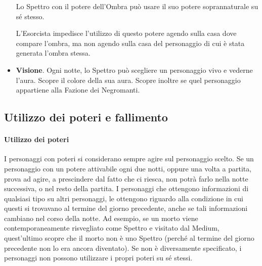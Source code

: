 \documentclass[a4paper,10pt]{article}
\begin{document}
\begin{itemize}
 Lo Spettro con il potere dell'Ombra può usare il suo potere soprannaturale su sé stesso.
 
 L'Esorcista impedisce l'utilizzo di questo potere agendo sulla casa dove compare l'ombra, ma non agendo sulla casa del personaggio di cui è stata generata l'ombra stessa.

  \item {\bf Visione}. Ogni notte, lo Spettro può scegliere un personaggio vivo e vederne l'aura. Scopre il colore della sua aura. Scopre inoltre se quel personaggio appartiene alla Fazione dei Negromanti.
 
%  

\end{itemize}


\subsection{Utilizzo dei poteri e fallimento}
\label{fallimento}

\paragraph{Utilizzo dei poteri} I personaggi con poteri si considerano sempre agire sul personaggio scelto. %
Se un personaggio con un potere attivabile ogni due notti, oppure una volta a partita, prova ad agire, a prescindere dal fatto che ci riesca, non potrà farlo nella notte successiva, o nel resto della partita.
I personaggi che ottengono informazioni di qualsiasi tipo su altri personaggi, le ottengono riguardo alla condizione in cui questi si trovavano al termine del giorno precedente, anche se tali informazioni cambiano nel corso della notte.
Ad esempio, se un morto viene contemporaneamente risvegliato come Spettro e visitato dal Medium, quest'ultimo scopre che il morto non è uno Spettro (perché al termine del giorno precedente non lo era ancora diventato).
Se non è diversamente specificato, i personaggi non possono utilizzare i propri poteri su sé stessi.
\end{document}
